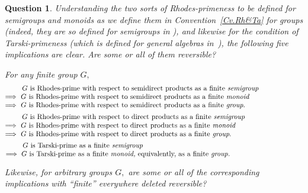 \documentclass{amsart}
\newtheorem{question}[theorem]{Question}
\numberwithin{equation}{section}
\numberwithin{theorem}{section}
\begin{document}
\begin{question}\label{Q.smgp,mnd,gp}
Understanding the two sorts of Rhodes-primeness to be defined
for semigroups and monoids as we define them
in Convention~\ref{Cv.Rh&Ta} for groups
{\rm(}indeed, they are so defined for semigroups in \cite{RS}{\rm)},
and likewise for the condition
of Tarski-primeness {\rm(}which is defined for general algebras
in~\cite{MMT}{\rm)}, the following
five implications are clear.
Are some or all of them reversible?

For any {\em finite} group $G,$
%
\begin{equation}\begin{minipage}[c]{35pc}\label{d.R_pm_smdir=>=>}
\hspace{2.4em}$G$ is Rhodes-prime with respect to semidirect products as
a finite {\em semigroup}\\
$\implies$ $G$ is Rhodes-prime with respect to semidirect products as
a finite {\em monoid}\\
$\implies$ $G$ is Rhodes-prime with respect to semidirect products as
a finite {\em group}.
\end{minipage}\end{equation}
%
\begin{equation}\begin{minipage}[c]{35pc}\label{d.R_pm_dir=>=>}
\hspace{2.4em}$G$ is Rhodes-prime with respect to direct products as
a finite {\em semigroup}\\
$\implies$ $G$ is Rhodes-prime with respect to direct products as
a finite {\em monoid}\\
$\implies$ $G$ is Rhodes-prime with respect to direct products as
a finite {\em group}.
\end{minipage}\end{equation}
%
\begin{equation}\begin{minipage}[c]{35pc}\label{d.T_pm=>=>}
\hspace{2.4em}$G$ is Tarski-prime as a finite {\em semigroup}\\
$\implies$ $G$ is Tarski-prime as a finite {\em monoid,}
equivalently, as a finite {\em group.}
\end{minipage}\end{equation}

Likewise, for arbitrary groups $G,$
are some or all of the corresponding implications
with ``finite'' everywhere deleted reversible?
\end{question}
\end{document}
